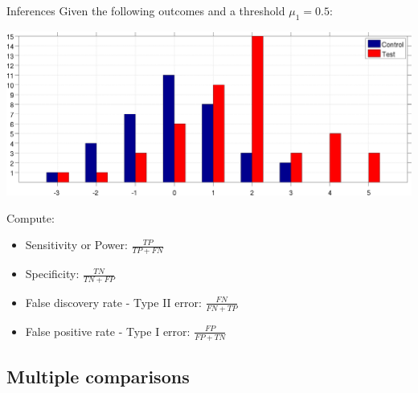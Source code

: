 \documentclass{beamer}
\begin{document}
\begin{frame}{Inferences}
Given the following outcomes and a threshold $\mu_{1} = 0.5$:

  \begin{center}
    \includegraphics[scale=0.055]{./Control_Test.jpg}
  \end{center}

Compute:
  \begin{itemize}
    \item Sensitivity or Power: $\frac{TP}{TP+FN}$
    \item Specificity: $\frac{TN}{TN+FP}$
    \item False discovery rate - Type II error: $\frac{FN}{FN+TP}$
    \item False positive rate - Type I error: $\frac{FP}{FP+TN}$
  \end{itemize}
\end{frame}


% 



\subsection[Multiple comparisons]{Multiple comparisons}
\end{document}
